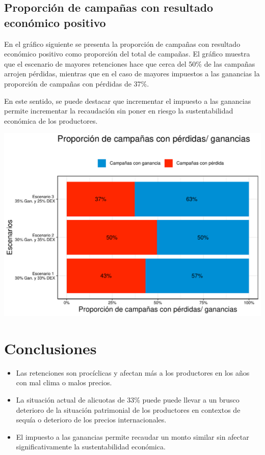 \documentclass[
  12pt,
  spanish,
  10pt]{article}
\begin{document}
\hypertarget{proporciuxf3n-de-campauxf1as-con-resultado-econuxf3mico-positivo}{%
\subsection{Proporción de campañas con resultado económico
positivo}\label{proporciuxf3n-de-campauxf1as-con-resultado-econuxf3mico-positivo}}

En el gráfico siguiente se presenta la proporción de campañas con
resultado económico positivo como proporción del total de campañas. El
gráfico muestra que el escenario de mayores retenciones hace que cerca
del 50\% de las campañas arrojen pérdidas, mientras que en el caso de
mayores impuestos a las ganancias la proporción de campañas con pérdidas
de 37\%.

En este sentido, se puede destacar que incrementar el impuesto a las
ganancias permite incrementar la recaudación sin poner en riesgo la
sustentabilidad económica de los productores.

\includegraphics{simulacion_retenciones_files/figure-latex/unnamed-chunk-19-1.pdf}

\hypertarget{conclusiones}{%
\section{Conclusiones}\label{conclusiones}}

\begin{itemize}
\item
  Las retenciones son procíclicas y afectan más a los productores en los
  años con mal clima o malos precios.
\item
  La situación actual de alicuotas de 33\% puede puede llevar a un
  brusco deterioro de la situación patrimonial de los productores en
  contextos de sequía o deterioro de los precios internacionales.
\item
  El impuesto a las ganancias permite recaudar un monto similar sin
  afectar significativamente la sustentabilidad económica.
\end{itemize}
\end{document}
